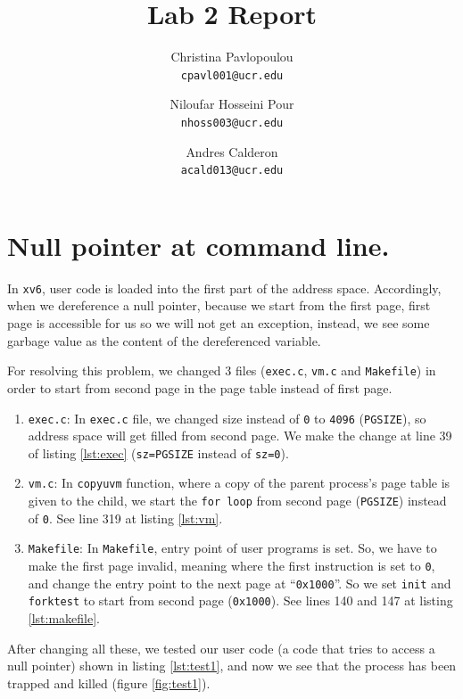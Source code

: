 \documentclass[a4paper,10pt]{scrartcl}
\title{Lab 2 Report}
\author{
   Christina Pavlopoulou\\
  \small \texttt{cpavl001@ucr.edu}
  \and
   Niloufar Hosseini Pour\\
  \small \texttt{nhoss003@ucr.edu}
  \and
   Andres Calderon\\
  \small \texttt{acald013@ucr.edu}
}
\begin{document}
\maketitle

\section{Null pointer at command line.}
In \texttt{xv6}, user code is loaded into the first part of the address space. Accordingly, when we dereference a null pointer,  because we start from the first page, first page is accessible for us so we will not get an exception, instead, we see some garbage value as the content of the dereferenced variable.

For resolving this problem, we changed 3 files (\texttt{exec.c}, \texttt{vm.c} and \texttt{Makefile}) in order to start from second page in the page table instead of first page.

\begin{enumerate}
 \item \texttt{exec.c}: In \texttt{exec.c} file, we changed size instead of \texttt{0} to \texttt{4096} (\texttt{PGSIZE}), so address space will get filled from second page.  We make the change at line 39 of listing \ref{lst:exec} (\texttt{sz=PGSIZE} instead of \texttt{sz=0}).
 \item \texttt{vm.c}: In \texttt{copyuvm} function, where a copy of the parent process's page table is given to the child, we start the \texttt{for loop} from second page (\texttt{PGSIZE}) instead of \texttt{0}.  See line 319 at listing \ref{lst:vm}.
 \item \texttt{Makefile}: In \texttt{Makefile}, entry point of user programs is set. So, we have to make the first page invalid, meaning where the first instruction is set to \texttt{0}, and change the entry point to the next page at ``\texttt{0x1000}''. So we set \texttt{init} and \texttt{forktest} to start from second page (\texttt{0x1000}). See lines 140 and 147 at listing \ref{lst:makefile}.
\end{enumerate}

After changing all these, we tested our user code (a code that tries to access a null pointer) shown in listing \ref{lst:test1}, and now we see that the process has been trapped and killed (figure \ref{fig:test1}).

\end{document}
